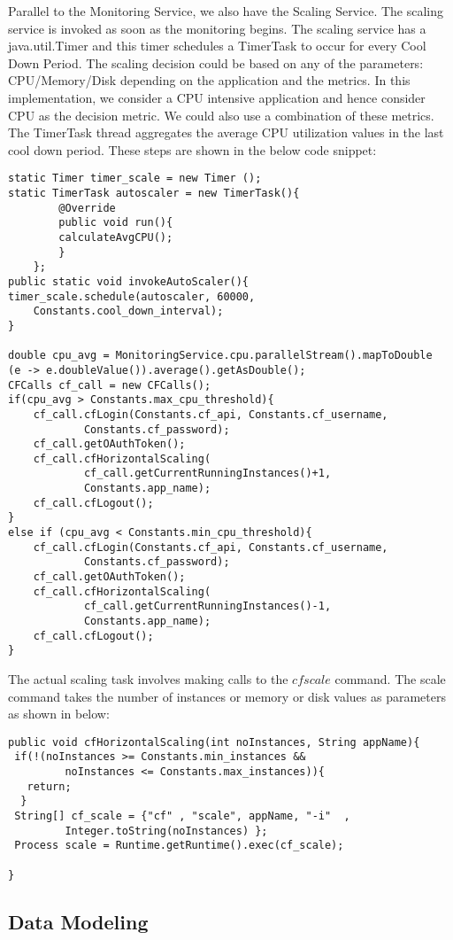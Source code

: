 \documentclass[article,type=msc,colorback,12pt,accentcolor=tud8b,table]{tudthesis}
\begin{document}
	Parallel to the Monitoring Service, we also have the Scaling Service. The scaling service is invoked as soon as the monitoring begins. The scaling service has a java.util.Timer and this timer schedules a TimerTask to occur for every Cool Down Period. The scaling decision could be based on any of the parameters: CPU/Memory/Disk depending on the application and the metrics. In this implementation, we consider a CPU intensive application and hence consider CPU as the decision metric. We could also use a combination of these metrics. The TimerTask thread aggregates the average CPU utilization values in the last cool down period. These steps are shown in the below code snippet:
\begin{lstlisting}
static Timer timer_scale = new Timer ();
static TimerTask autoscaler = new TimerTask(){
	 	@Override
	 	public void run(){
	 	calculateAvgCPU();
	 	}
 	};
public static void invokeAutoScaler(){
timer_scale.schedule(autoscaler, 60000, 
	Constants.cool_down_interval);
}

double cpu_avg = MonitoringService.cpu.parallelStream().mapToDouble
(e -> e.doubleValue()).average().getAsDouble();
CFCalls cf_call = new CFCalls();
if(cpu_avg > Constants.max_cpu_threshold){
	cf_call.cfLogin(Constants.cf_api, Constants.cf_username, 
			Constants.cf_password);
	cf_call.getOAuthToken();
	cf_call.cfHorizontalScaling(
			cf_call.getCurrentRunningInstances()+1, 
			Constants.app_name);
	cf_call.cfLogout();
}
else if (cpu_avg < Constants.min_cpu_threshold){
	cf_call.cfLogin(Constants.cf_api, Constants.cf_username, 
			Constants.cf_password);
	cf_call.getOAuthToken();
	cf_call.cfHorizontalScaling(
			cf_call.getCurrentRunningInstances()-1, 
			Constants.app_name);
	cf_call.cfLogout();
}
\end{lstlisting}
	The actual scaling task involves making calls to the $cf scale$ command. The scale command takes the number of instances or memory or disk values as parameters as shown in below:
	\begin{lstlisting}
public void cfHorizontalScaling(int noInstances, String appName){
 if(!(noInstances >= Constants.min_instances && 
		 noInstances <= Constants.max_instances)){
   return;
  }
 String[] cf_scale = {"cf" , "scale", appName, "-i"  , 
		 Integer.toString(noInstances) };
 Process scale = Runtime.getRuntime().exec(cf_scale);

}	
	\end{lstlisting}
	
	\subsection{Data Modeling}
 
\end{document}
